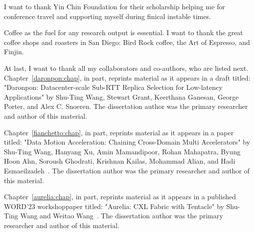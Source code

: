 \begin{frontmatter}
\begin{acknowledgements}
I want to thank Yin Chin Foundation for their scholarship helping me for conference travel and supporting myself during finical instable times.

Coffee as the fuel for any research output is essential. I want to thank the great coffee shops and roasters in San Diego: Bird Rock coffee, the Art of Espresso, and Finjin. 

At last, I want to thank all my collaborators and co-authors, who are listed next.
%
Chapter~\ref{daronpon:chap}, in part, reprints material as it appears in a draft titled: 
"Daronpon: Datacenter-scale Sub-RTT Replica Selection for Low-latency Applications"
by Shu-Ting Wang, Stewart Grant, Keerthana Ganesan, George Porter, and Alex C. Snoeren.
%
The dissertation author was the primary researcher and author of this material.

Chapter~\ref{fianchetto:chap}, in part, reprints material as it appears in a paper titled: "Data Motion Acceleration: Chaining Cross-Domain Multi Accelerators"
by Shu-Ting Wang, Hanyang Xu, Amin Mamandipoor, Rohan Mahapatra, Byung Hoon Ahn, 
Soroush Ghodrati, Krishnan Kailas, Mohammad Alian, and Hadi Esmaeilzadeh~\cite{dmx:hpca:2024}.
% 
The dissertation author was the primary researcher and author of this material.

Chapter~\ref{aurelia:chap}, in part, reprints material as it appears in a published WORD'23 workshoppaper titled: 
"Aurelia: CXL Fabric with Tentacle" by Shu-Ting Wang and Weitao Wang~\cite{aurelia:words:2023}. 
%
The dissertation author was the primary researcher and author of this material.
%
\end{acknowledgements}



\end{frontmatter}
